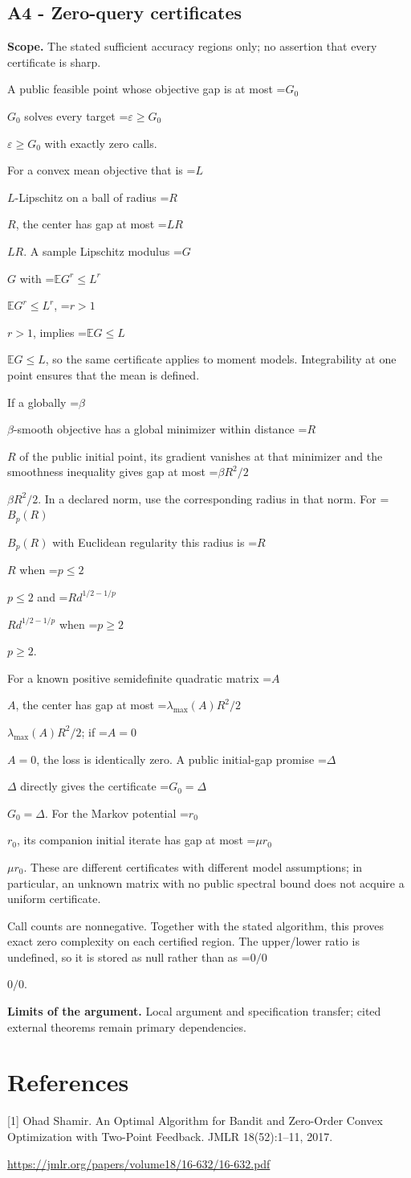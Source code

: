 \documentclass[10pt,a4paper]{article}
\newcommand{\AtlasMath}[1]{\par\begingroup\centering\setbox0=\hbox{$\displaystyle #1$}\ifdim\wd0>1.4\linewidth\typeout{ATLAS WIDE FORMULA: \the\wd0}\fi\ifdim\wd0>\linewidth\resizebox{\linewidth}{!}{\box0}\else\box0\fi\par\endgroup}
\newcommand{\AtlasInlineMath}[1]{\begingroup\setbox0=\hbox{$#1$}\ifdim\wd0>.4\linewidth\endgroup\AtlasMath{#1}\else\endgroup$#1$\fi}
\begin{document}
\subsection{A4 - Zero-query certificates}
\textbf{Scope.} The stated sufficient accuracy regions only; no assertion that every certificate is sharp.

A public feasible point whose objective gap is at most \AtlasInlineMath{G_0} solves every target \AtlasInlineMath{\varepsilon\ge G_0} with exactly zero calls.

For a convex mean objective that is \AtlasInlineMath{L}-Lipschitz on a ball of radius \AtlasInlineMath{R}, the center has gap at most \AtlasInlineMath{LR}. A sample Lipschitz modulus \AtlasInlineMath{G} with \AtlasInlineMath{\mathbb E G^r\le L^r}, \AtlasInlineMath{r>1}, implies \AtlasInlineMath{\mathbb E G\le L}, so the same certificate applies to moment models. Integrability at one point ensures that the mean is defined.

If a globally \AtlasInlineMath{\beta}-smooth objective has a global minimizer within distance \AtlasInlineMath{R} of the public initial point, its gradient vanishes at that minimizer and the smoothness inequality gives gap at most \AtlasInlineMath{\beta R^2/2}. In a declared norm, use the corresponding radius in that norm. For \AtlasInlineMath{B_p(R)} with Euclidean regularity this radius is \AtlasInlineMath{R} when \AtlasInlineMath{p\le2} and \AtlasInlineMath{R d^{1/2-1/p}} when \AtlasInlineMath{p\ge2}.

For a known positive semidefinite quadratic matrix \AtlasInlineMath{A}, the center has gap at most \AtlasInlineMath{\lambda_{\max}(A)R^2/2}; if \AtlasInlineMath{A=0}, the loss is identically zero. A public initial-gap promise \AtlasInlineMath{\Delta} directly gives the certificate \AtlasInlineMath{G_0=\Delta}. For the Markov potential \AtlasInlineMath{r_0}, its companion initial iterate has gap at most \AtlasInlineMath{\mu r_0}. These are different certificates with different model assumptions; in particular, an unknown matrix with no public spectral bound does not acquire a uniform certificate.

Call counts are nonnegative. Together with the stated algorithm, this proves exact zero complexity on each certified region. The upper/lower ratio is undefined, so it is stored as null rather than as \AtlasInlineMath{0/0}.

\textbf{Limits of the argument.} Local argument and specification transfer; cited external theorems remain primary dependencies.

\section{References}
[1] Ohad Shamir. An Optimal Algorithm for Bandit and Zero-Order Convex Optimization with Two-Point Feedback. JMLR 18(52):1--11, 2017.

\url{https://jmlr.org/papers/volume18/16-632/16-632.pdf}
\end{document}
